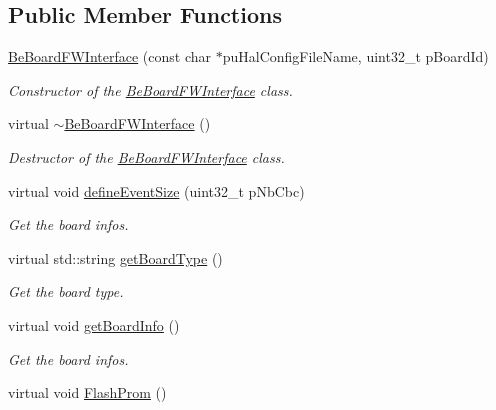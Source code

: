 \subsection*{Public Member Functions}
\begin{DoxyCompactItemize}
\item 
\hyperlink{class_ph2___hw_interface_1_1_be_board_f_w_interface_a6a6be2907a3f6494422abb3ae2b35bd1}{Be\-Board\-F\-W\-Interface} (const char $\ast$pu\-Hal\-Config\-File\-Name, uint32\-\_\-t p\-Board\-Id)
\begin{DoxyCompactList}\small\item\em Constructor of the \hyperlink{class_ph2___hw_interface_1_1_be_board_f_w_interface}{Be\-Board\-F\-W\-Interface} class. \end{DoxyCompactList}\item 
virtual \hyperlink{class_ph2___hw_interface_1_1_be_board_f_w_interface_a22077ee1db6eb5ae149165bff88b5fa0}{$\sim$\-Be\-Board\-F\-W\-Interface} ()
\begin{DoxyCompactList}\small\item\em Destructor of the \hyperlink{class_ph2___hw_interface_1_1_be_board_f_w_interface}{Be\-Board\-F\-W\-Interface} class. \end{DoxyCompactList}\item 
virtual void \hyperlink{class_ph2___hw_interface_1_1_be_board_f_w_interface_aa93b2f84ca29ea20053fb42e5c8f3bb0}{define\-Event\-Size} (uint32\-\_\-t p\-Nb\-Cbc)
\begin{DoxyCompactList}\small\item\em Get the board infos. \end{DoxyCompactList}\item 
virtual std\-::string \hyperlink{class_ph2___hw_interface_1_1_be_board_f_w_interface_a895bb5ac8dfb81a00a047a6d8f5281b2}{get\-Board\-Type} ()
\begin{DoxyCompactList}\small\item\em Get the board type. \end{DoxyCompactList}\item 
virtual void \hyperlink{class_ph2___hw_interface_1_1_be_board_f_w_interface_a717caf9d29d3a7e92efceae18ad1dd78}{get\-Board\-Info} ()
\begin{DoxyCompactList}\small\item\em Get the board infos. \end{DoxyCompactList}\item 
virtual void \hyperlink{class_ph2___hw_interface_1_1_be_board_f_w_interface_ad19ee1309003c559db472046af4620d5}{Flash\-Prom} ()

\end{DoxyCompactItemize}
